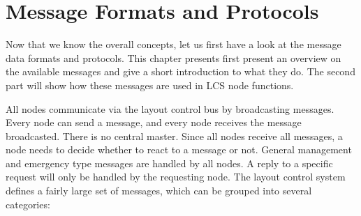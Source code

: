 \chapter{Message Formats and Protocols}

Now that we know the overall concepts, let us first have a look at the message data formats and protocols. This chapter presents first present an overview on the available messages and give a short introduction to what they do. The second part will show how these messages are used in LCS node functions. 

\begin{center}
\end{center}

All nodes communicate via the layout control bus by broadcasting messages. Every node can send a message, and every node receives the message broadcasted. There is no central master. Since all nodes receive all messages, a node needs to decide whether to react to a message or not. General management and emergency type messages are handled by all nodes. A reply to a specific request will only be handled by the requesting node. The layout control system defines a fairly large set of messages, which can be grouped into several categories:

